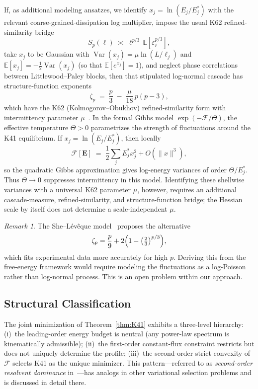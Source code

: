 \documentclass[12pt,a4paper]{article}
\theoremstyle{definition}
\theoremstyle{plain}
\theoremstyle{remark}
\newtheorem{remark}[definition]{Remark}
\begin{document}
If, as additional modeling ansatzes, we identify
$x_j=\ln(E_j/E_j^*)$ with the relevant coarse-grained-dissipation log
multiplier, impose the usual K62 refined-similarity bridge
\[
  S_p(\ell) \;\asymp\; \ell^{p/3}\,\mathbb{E}[\varepsilon_\ell^{p/3}],
\]
take $x_j$ to be Gaussian with
$\operatorname{Var}(x_j)=\mu\ln(L/\ell_j)$ and
$\mathbb{E}[x_j]=-\tfrac12\operatorname{Var}(x_j)$ (so that
$\mathbb{E}[e^{x_j}]=1$), and neglect phase correlations between
Littlewood--Paley blocks, then that stipulated log-normal cascade has
structure-function exponents
\begin{equation}\label{eq:zeta_p}
  \zeta_p
  \;=\;
  \frac{p}{3}
  \;-\;
  \frac{\mu}{18}\,p(p-3),
\end{equation}
which have the K62 (Kolmogorov--Obukhov) refined-similarity form with
intermittency parameter $\mu$~\cite{K62,Frisch95}.  In the formal Gibbs
model $\exp(-\mathcal{F}/\Theta)$, the effective temperature
$\Theta > 0$ parametrizes the strength of fluctuations around the K41
equilibrium.  If $x_j=\ln(E_j/E_j^*)$, then locally
\[
  \mathcal{F}[\mathbf{E}]
  \;=\;
  \frac{1}{2}\sum_j E_j^* x_j^2 + O(\|x\|^3),
\]
so the quadratic Gibbs approximation gives log-energy variances of order
$\Theta/E_j^*$.  Thus $\Theta\to0$ suppresses intermittency in this
model.  Identifying these shellwise variances with a universal K62
parameter $\mu$, however, requires an additional cascade-measure,
refined-similarity, and structure-function bridge; the Hessian scale by
itself does not determine a scale-independent $\mu$.

\begin{remark}
The She--Lévêque model~\cite{SL94} proposes the alternative
\[
  \zeta_p = \frac{p}{9} + 2\Bigl(1 - \bigl(\tfrac{2}{3}\bigr)^{p/3}\Bigr),
\]
which fits experimental data more accurately for high $p$.  Deriving this
from the free-energy framework would require modeling the fluctuations as
a log-Poisson rather than log-normal process.  This is an open problem
within our approach.
\end{remark}

\subsection{Structural Classification}\label{sec:resolvent-cascade}

The joint minimization of Theorem~\ref{thm:K41} exhibits a three-level
hierarchy: (i)~the leading-order energy budget is neutral (any power-law
spectrum is kinematically admissible); (ii)~the first-order constant-flux
constraint restricts but does not uniquely determine the profile;
(iii)~the second-order strict convexity of~$\mathcal{F}$ selects K41 as
the unique minimizer.  This pattern---referred to as
\emph{second-order resolvent dominance} in~\cite{FST-Unified2026}---has
analogs in other variational selection problems and is discussed in
detail there.
\end{document}
